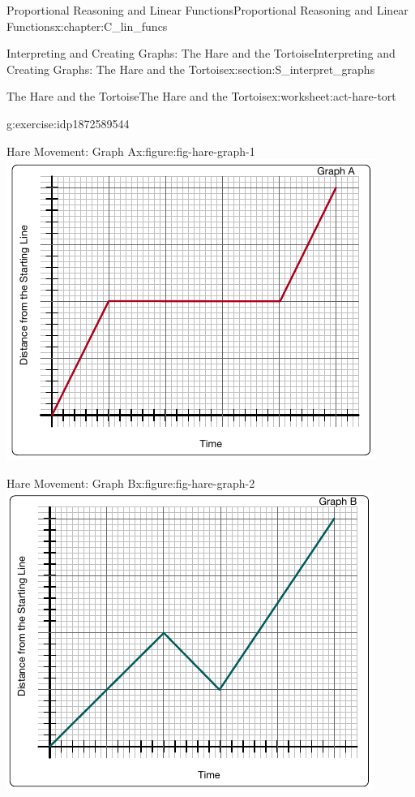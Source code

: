\documentclass[oneside,10pt,]{book}
\numberwithin{equation}{chapter}
\begin{document}
\begin{chapterptx}{Proportional Reasoning and Linear Functions}{}{Proportional Reasoning and Linear Functions}{}{}{x:chapter:C_lin_funcs}
\begin{sectionptx}{Interpreting and Creating Graphs: The Hare and the Tortoise}{}{Interpreting and Creating Graphs: The Hare and the Tortoise}{}{}{x:section:S_interpret_graphs}
\begin{worksheet-subsection}{The Hare and the Tortoise}{}{The Hare and the Tortoise}{}{}{x:worksheet:act-hare-tort}
\begin{divisionexercise}{2}{}{}{g:exercise:idp1872589544}
\begin{sidebyside}{2}{0}{0}{0}
\begin{sbspanel}{0.5}
\begin{figureptx}{Hare Movement: Graph A}{x:figure:fig-hare-graph-1}{}
\includegraphics[width=\linewidth]{external/hare-graph-1.pdf}
\tcblower
\end{figureptx}%
\end{sbspanel}%
\begin{sbspanel}{0.5}%
\begin{figureptx}{Hare Movement: Graph B}{x:figure:fig-hare-graph-2}{}%
\includegraphics[width=\linewidth]{external/hare-graph-2.pdf}
\tcblower
\end{figureptx}%
\end{sbspanel}%
\end{sidebyside}%

\end{divisionexercise}
\end{worksheet-subsection}
\end{sectionptx}
\end{chapterptx}
\end{document}
